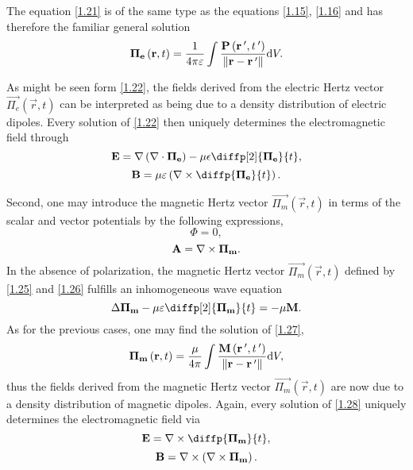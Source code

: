 The equation \ref{1.21} is of the same type as the equations \ref{1.15}, \ref{1.16} and has therefore the familiar general solution 
\begin{equation}
\label{1.22}
\mathbf{\Pi_e}\left(\mathbf{r}, t \right) = \frac{1}{4 \pi \varepsilon} \int \frac{\mathbf{P}\left(\mathbf{r^{\: \prime}}, t^{\: \prime} \right)}{\lVert\mathbf{r} - \mathbf{r^{\: \prime}}\rVert} \mathrm{d} V.
\end{equation}

As might be seen form \ref{1.22}, the fields derived from the electric Hertz vector $ {\vec{\Pi_e}}\left(\vec{r}, t \right) $ can be interpreted as being due to a density distribution of electric dipoles. Every solution of \ref{1.22} then uniquely determines the electromagnetic field through
\begin{equation}
\label{1.23}
\vec{E} = \grad{\left(\div{\vec{\Pi_e}}\right)} - \mu \epsilon \diffp[2]{\vec{\Pi_e}}{t},
\end{equation}
\begin{equation}
\label{1.24}
\vec{B} = \mu \varepsilon \left(\rot{\diffp{\vec{\Pi_e}}{t}}\right).
\end{equation}

Second, one may introduce the magnetic Hertz vector $ {\vec{\Pi_m}}\left(\vec{r}, t \right) $ in terms of the scalar and vector potentials by the following expressions,
\begin{equation}
\label{1.25}
\Phi = 0,
\end{equation}
\begin{equation}
\label{1.26}
\mathbf{A} = \nabla \times \mathbf{\Pi_m}.
\end{equation}
In the absence of polarization, the magnetic Hertz vector $ {\vec{\Pi_m}}\left(\vec{r}, t \right) $ defined by \ref{1.25} and \ref{1.26} fulfills an inhomogeneous wave equation
\begin{equation}
\label{1.27}
\laplace{\vec{\Pi_m}} - \mu \varepsilon \diffp[2]{\vec{\Pi_m}}{t} = -\mu \vec{M}.
\end{equation}
As for the previous cases, one may find the solution of \ref{1.27},
\begin{equation}
\label{1.28}
\mathbf{\Pi_m}\left(\mathbf{r}, t \right) = \frac{\mu}{4 \pi} \int \frac{\mathbf{M}\left(\mathbf{r^{\: \prime}}, t^{\: \prime} \right)}{\lVert\mathbf{r} - \mathbf{r^{\: \prime}}\rVert} \mathrm{d} V,
\end{equation}
thus the fields derived from the magnetic Hertz vector $ {\vec{\Pi_m}}\left(\vec{r}, t \right) $ are now due to a density distribution of magnetic dipoles. Again, every solution of \ref{1.28} uniquely determines the electromagnetic field via
\begin{equation}
\label{1.29}
\vec{E} = \rot{\diffp{\vec{\Pi_m}}{t}},
\end{equation}
\begin{equation}
\label{1.30}
\mathbf{B} = \nabla \times \left(\nabla \times \mathbf{\Pi_m}\right).
\end{equation}

